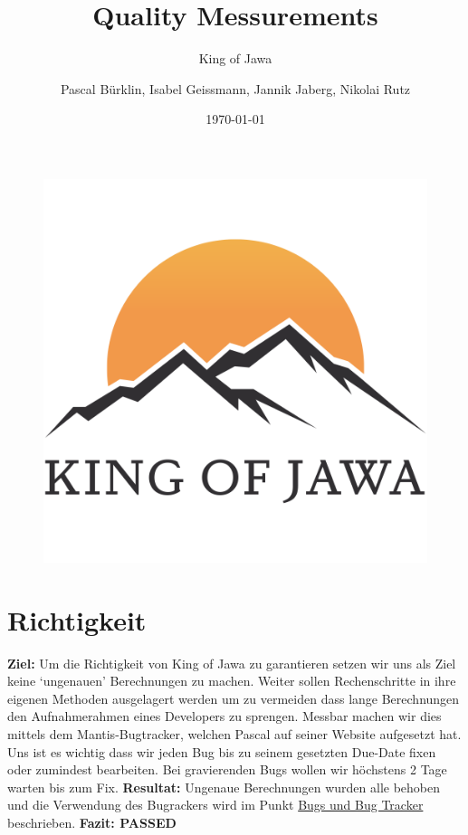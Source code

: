 \documentclass[]{scrartcl}
\title{Quality Messurements}
\subtitle{King of Jawa}
\author{Pascal Bürklin, Isabel Geissmann, Jannik Jaberg, Nikolai Rutz}
\date{\today}
\newcommand{\n}{\newline}
\begin{document}
\maketitle
\begin{figure}[H]
	\includegraphics[width=\linewidth]{LOGO.png}
\end{figure}
\tableofcontents

\section{Richtigkeit}
\label{sec:Richtigkeit}
\textbf{Ziel:} Um die Richtigkeit von King of Jawa zu garantieren setzen wir uns als Ziel keine ‘ungenauen’ Berechnungen zu machen. Weiter sollen Rechenschritte in ihre eigenen Methoden ausgelagert werden um zu vermeiden dass lange Berechnungen den Aufnahmerahmen eines Developers zu sprengen. Messbar machen wir dies mittels dem Mantis-Bugtracker, welchen Pascal auf seiner Website aufgesetzt hat. Uns ist es wichtig dass wir jeden Bug bis zu seinem gesetzten Due-Date fixen oder zumindest bearbeiten. Bei gravierenden Bugs wollen wir höchstens 2 Tage warten bis zum Fix. \n
\textbf{Resultat:} Ungenaue Berechnungen wurden alle behoben und die Verwendung des Bugrackers wird im Punkt \hyperref[ssec:Bugs]{Bugs und Bug Tracker} beschrieben.\n
\textbf{Fazit: PASSED}
\end{document}
